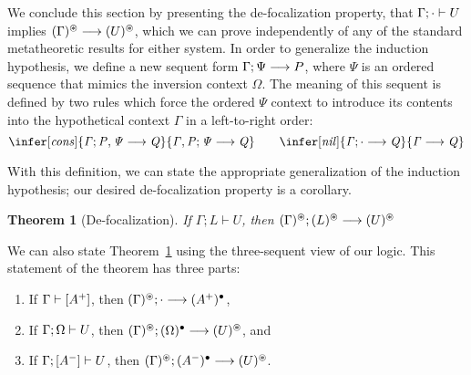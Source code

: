 \documentclass[acmtocl]{robtrans}\pdfoutput=1
\newtheorem{theorem}{Theorem}
\newcommand{\seq}[2]{{#1} \longrightarrow {#2} \mathstrut}
\newcommand{\efoc}[3]{{#1}; {#2} \vdash {#3}}
\newcommand{\rfoc}[2]{{#1} \vdash [{#2}] \mathstrut}
\newcommand{\lfoc}[3]{{#1}; [{#2}] \vdash {#3} \mathstrut}
\newcommand{\ifoc}[3]{{#1}; {#2} \vdash {#3} \mathstrut}
\begin{document}
We conclude this section by presenting the de-focalization property,
that $\ifoc{\Gamma}{\cdot}{U}$ implies
$\seq{(\Gamma)^\circledast}{(U)^\circledast}$, which we can prove independently
of any of the standard metatheoretic results for either system.
In order to generalize the induction hypothesis, we define
a new sequent form $\seq{\Gamma; \Psi}{P}$, where $\Psi$ is an ordered sequence 
that mimics the inversion context $\Omega$. The meaning of this 
sequent is defined
by two rules which force the ordered $\Psi$ context to introduce its contents
into the hypothetical context $\Gamma$ in a left-to-right order:
\[
\infer[\it cons]
{\seq{\Gamma; P, \Psi}{Q}}
{\seq{\Gamma, P; \Psi}{Q}}
\qquad
\infer[\it nil]
{\seq{\Gamma; \cdot}{Q}}
{\seq{\Gamma}{Q}}
\]

With this definition, we can state the appropriate generalization of
the induction hypothesis; our desired de-focalization property is a
corollary.

\begin{theorem}[De-focalization]\label{thm:soundness}
If $\efoc{\Gamma}{L}{U}$, then 
   $\seq{(\Gamma)^\circledast; (L)^\circledast}{(U)^\circledast}$
\end{theorem}
We can also state Theorem~\ref{thm:soundness} using the three-sequent
view of our logic. This statement of the theorem has three parts:
\begin{enumerate}
\item If $\rfoc{\Gamma}{A^+}$,
      then $\seq{(\Gamma)^\circledast; \cdot}{(A^+)^\bullet}$,
\item If $\ifoc{\Gamma}{\Omega}{U}$,
      then $\seq{(\Gamma)^\circledast; (\Omega)^\bullet}{(U)^\circledast}$, and
\item If $\lfoc{\Gamma}{A^-}{U}$, 
      then $\seq{(\Gamma)^\circledast; (A^-)^\bullet}{(U)^\circledast}$.
\end{enumerate}
\end{document}

